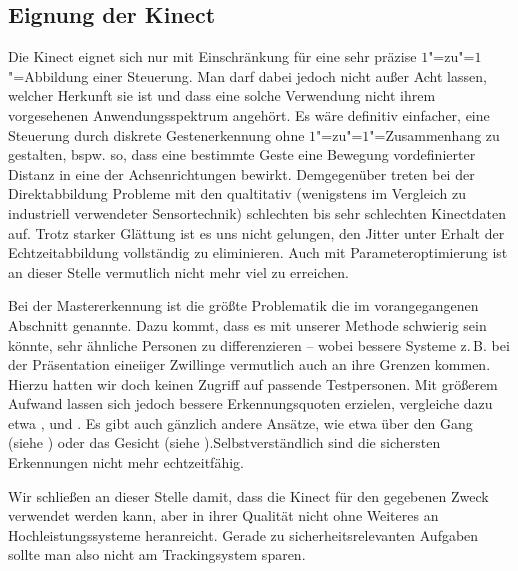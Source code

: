 \subsection{Eignung der Kinect}
Die Kinect eignet sich nur mit Einschränkung für eine sehr präzise $1$"=zu"=$1$"=Abbildung einer Steuerung. Man darf dabei jedoch nicht außer Acht lassen, welcher Herkunft sie ist und dass eine solche Verwendung nicht ihrem vorgesehenen Anwendungsspektrum angehört. Es wäre definitiv einfacher, eine Steuerung durch diskrete Gestenerkennung ohne $1$"=zu"=$1$"=Zusammenhang zu gestalten, bspw. so, dass eine bestimmte Geste eine Bewegung vordefinierter Distanz in eine der Achsenrichtungen bewirkt. Demgegenüber treten bei der Direktabbildung Probleme mit den qualtitativ (wenigstens im Vergleich zu industriell verwendeter Sensortechnik) schlechten bis sehr schlechten Kinectdaten auf. Trotz starker Glättung ist es uns nicht gelungen, den Jitter unter Erhalt der Echtzeitabbildung vollständig zu eliminieren. Auch mit Parameteroptimierung ist an dieser Stelle vermutlich nicht mehr viel zu erreichen.\par 
Bei der Mastererkennung ist die größte Problematik die im vorangegangenen Abschnitt genannte. Dazu kommt, dass es mit unserer Methode schwierig sein könnte, sehr ähnliche Personen zu differenzieren -- wobei bessere Systeme z.\,B. bei der Präsentation eineiiger Zwillinge vermutlich auch an ihre Grenzen kommen. Hierzu hatten wir doch keinen Zugriff auf passende Testpersonen. Mit größerem Aufwand lassen sich jedoch bessere Erkennungsquoten erzielen, vergleiche dazu etwa \cite{appearance}, \cite{biomid} und \cite{bodyprop}. Es gibt auch gänzlich andere Ansätze, wie etwa über den Gang (siehe \cite{gait}) oder das Gesicht (siehe \cite{face}).Selbstverständlich sind die sichersten Erkennungen nicht mehr echtzeitfähig.\par 
Wir schließen an dieser Stelle damit, dass die Kinect für den gegebenen Zweck verwendet werden kann, aber in ihrer Qualität nicht ohne Weiteres an Hochleistungssysteme heranreicht. Gerade zu sicherheitsrelevanten Aufgaben sollte man also nicht am Trackingsystem sparen.
%
